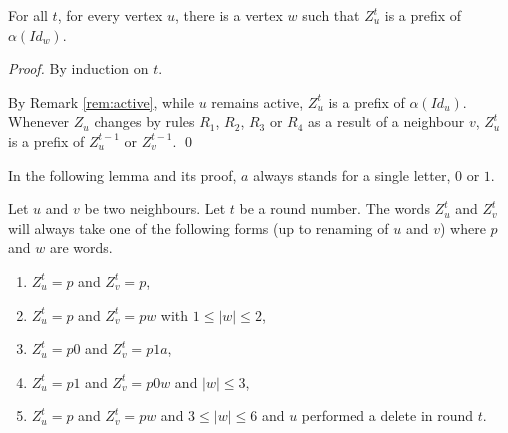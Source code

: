 \documentclass[11pt,envcountsame,letterpaper]{llncs}
\begin{document}
\begin{lemma}
\label{lem:prefix}
For all $t$,
for every vertex $u$, there is a vertex $w$ such that $Z_u^t$ is a prefix of
$\alpha(Id_w)$.
\end{lemma}


\begin{proof}
By induction on $t$.

By Remark \ref{rem:active}, while $u$ remains active,
$Z_u^t$ is a prefix of $\alpha(Id_u)$.
Whenever $Z_u$ changes by rules $R_1$, $R_2$, $R_3$ or $R_4$ as a result 
of a neighbour $v$, $Z_u^t$ is a prefix of $Z_u^{t-1}$ or $Z_v^{t-1}$.
\qed
\end{proof} 

In the following lemma and its proof, $a$ always stands for a single letter,
$0$ or $1$.
\begin{lemma}
\label{lem:voisins}
Let $u$ and $v$ be two neighbours. Let $t$ be a round number.
The words $Z_u^t$ and $Z_v^t$
will always take one of the following forms (up to renaming of $u$ and $v$)
where $p$ and $w$ are words.
\begin{enumerate}
\item $Z_u^t=p$ and $Z_v^t=p$,
\item  $Z_u^t=p$ and $Z_v^t=pw$ with $1\leq |w|\leq 2$,
\item $Z_u^t=p0$  and $Z_v^t=p1a$,
\item  $Z_u^t=p1$ and $Z_v^t=p0w$ and $|w|\leq 3$,
\item $Z_u^t=p$ and $Z_v^t=pw$ and $3\leq |w| \leq 6$ and $u$ performed
a delete in round $t$.
\end{enumerate}
\end{lemma}
\end{document}
